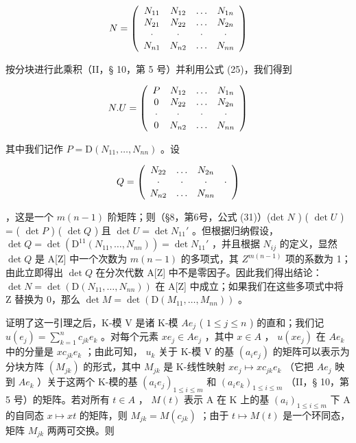 \[
N = \left( \begin{array}{c c c c} N _ {1 1} & N _ {1 2} & \ldots & N _ {1 n} \\ N _ {2 1} & N _ {2 2} & \ldots & N _ {2 n} \\ \cdot & \cdot & \cdot & \cdot \\ N _ {n 1} & N _ {n 2} & \ldots & N _ {n n} \end{array} \right)
\]

按分块进行此乘积（II，§ 10，第 5 号）并利用公式 (25)，我们得到

\[
N. U = \left( \begin{array}{c c c c} P & N _ {1 2} & \ldots & N _ {1 n} \\ 0 & N _ {2 2} & \ldots & N _ {2 n} \\ \cdot & \cdot & \cdot & \cdot \\ 0 & N _ {n 2} & \ldots & N _ {n n} \end{array} \right)
\]

其中我们记作 \(P = \mathrm{D}(N_{11},\ldots ,N_{nn})\) 。设

\[
Q = \left( \begin{array}{c c c c} N _ {2 2} & \ldots & N _ {2 n} \\ \cdot & \cdot & \cdot & \cdot \\ N _ {n 2} & \ldots & N _ {n n} \end{array} \right)
\]

，这是一个 \(m(n - 1)\) 阶矩阵；则（§8，第6号，公式 (31)）(det \(N\) ) ( \(\det U\) ) = ( \(\det P\) ) ( \(\det Q\) ) 且 \(\det U = \det N_{11}'\) 。但根据归纳假设， \(\det Q = \det(\mathrm{D}^{11}(N_{11},\ldots ,N_{nn})) = \det N_{11}'\) ，并且根据 \(N_{ij}\) 的定义，显然 \(\det Q\) 是 A{[}Z{]} 中一个次数为 \(m(n - 1)\) 的多项式，其 \(Z^{m(n - 1)}\) 项的系数为 1；由此立即得出 \(\det Q\) 在分次代数 A{[}Z{]} 中不是零因子。因此我们得出结论： \(\det N = \det(\mathrm{D}(N_{11},\ldots ,N_{nn}))\) 在 A{[}Z{]} 中成立；如果我们在这些多项式中将 Z 替换为 0，那么 \(\det M = \det(\mathrm{D}(M_{11},\ldots ,M_{nn}))\) 。

证明了这一引理之后，K-模 V 是诸 K-模 \(Ae_{j}\) ( \(1 \leqslant j \leqslant n\) ) 的直和；我们记 \(u(e_{j}) = \sum_{k=1}^{n} c_{jk} e_{k}\) 。对每个元素 \(xe_{j} \in Ae_{j}\) ，其中 \(x \in A\) ， \(u(xe_{j})\) 在 \(Ae_{k}\) 中的分量是 \(xc_{jk} e_{k}\) ；由此可知， \(u_{k}\) 关于 K-模 V 的基 \((a_{i} e_{j})\) 的矩阵可以表示为分块方阵 \((M_{jk})\) 的形式，其中 \(M_{jk}\) 是 K-线性映射 \(xe_{j} \mapsto xc_{jk} e_{k}\) （它把 \(Ae_{j}\) 映到 \(Ae_{k}\) ）关于这两个 K-模的基 \((a_{i} e_{j})_{1 \leqslant i \leqslant m}\) 和 \((a_{i} e_{k})_{1 \leqslant i \leqslant m}\) （II，§ 10，第 5 号）的矩阵。若对所有 \(t \in A\) ， \(M(t)\) 表示 A 在 K 上的基 \((a_{i})_{1 \leqslant i \leqslant m}\) 下 A 的自同态 \(x \mapsto xt\) 的矩阵，则 \(M_{jk} = M(c_{jk})\) ；由于 \(t \mapsto M(t)\) 是一个环同态，矩阵 \(M_{jk}\) 两两可交换。则

